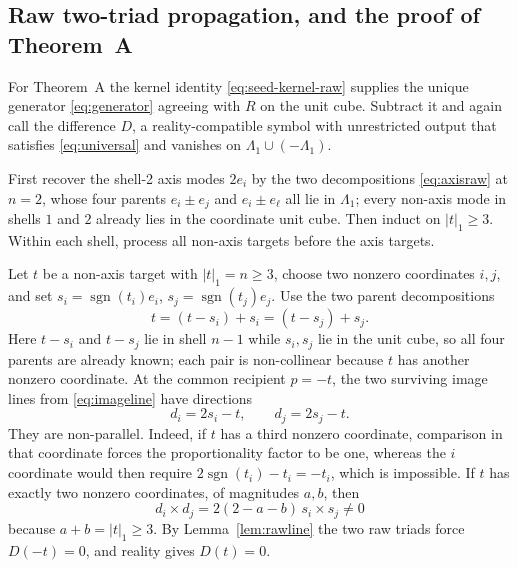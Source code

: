 \documentclass[11pt]{article}
\theoremstyle{definition}
\theoremstyle{remark}
\theoremstyle{plain}
\DeclareMathOperator{\sgn}{sgn}
\begin{document}
\subsection{Raw two-triad propagation, and the proof of Theorem~A}
\label{subsec:rawprop}

For Theorem~A the kernel identity \eqref{eq:seed-kernel-raw} supplies the
unique generator \eqref{eq:generator} agreeing with $R$ on the unit cube.
Subtract it and again call the difference $D$, a reality-compatible symbol with
unrestricted output that satisfies \eqref{eq:universal} and vanishes on
$\Lambda_{1}\cup(-\Lambda_{1})$.

First recover the shell-2 axis modes $2e_{i}$ by the two decompositions
\eqref{eq:axisraw} at $n=2$, whose four parents $e_{i}\pm e_{j}$ and
$e_{i}\pm e_{\ell}$ all lie in $\Lambda_{1}$; every non-axis mode in shells
$1$ and $2$ already lies in the coordinate unit cube. Then induct on
$|t|_{1}\ge3$. Within each shell, process all non-axis targets before the
axis targets.

Let $t$ be a non-axis target with $|t|_{1}=n\ge3$, choose two nonzero
coordinates $i,j$, and set $s_{i}=\sgn(t_{i})e_{i}$, $s_{j}=\sgn(t_{j})e_{j}$.
Use the two parent decompositions
\begin{equation}
\label{eq:twoparents}
t=(t-s_{i})+s_{i}=(t-s_{j})+s_{j}.
\end{equation}
Here $t-s_{i}$ and $t-s_{j}$ lie in shell $n-1$ while $s_{i},s_{j}$ lie in the
unit cube, so all four parents are already known; each pair is non-collinear
because $t$ has another nonzero coordinate. At the common recipient $p=-t$,
the two surviving image lines from \eqref{eq:imageline} have directions
\begin{equation}
\label{eq:difdirs}
d_{i}=2s_{i}-t,
\qquad
d_{j}=2s_{j}-t .
\end{equation}
They are non-parallel. Indeed, if $t$ has a third nonzero coordinate,
comparison in that coordinate forces the proportionality factor to be one,
whereas the $i$ coordinate would then require
$2\sgn(t_{i})-t_{i}=-t_{i}$, which is impossible. If $t$ has exactly two
nonzero coordinates, of magnitudes $a,b$, then
\[
d_{i}\times d_{j}=2(2-a-b)\,s_{i}\times s_{j}\ne0
\]
because $a+b=|t|_{1}\ge3$. By Lemma~\ref{lem:rawline} the two raw triads force
$D(-t)=0$, and reality gives $D(t)=0$.
\end{document}
